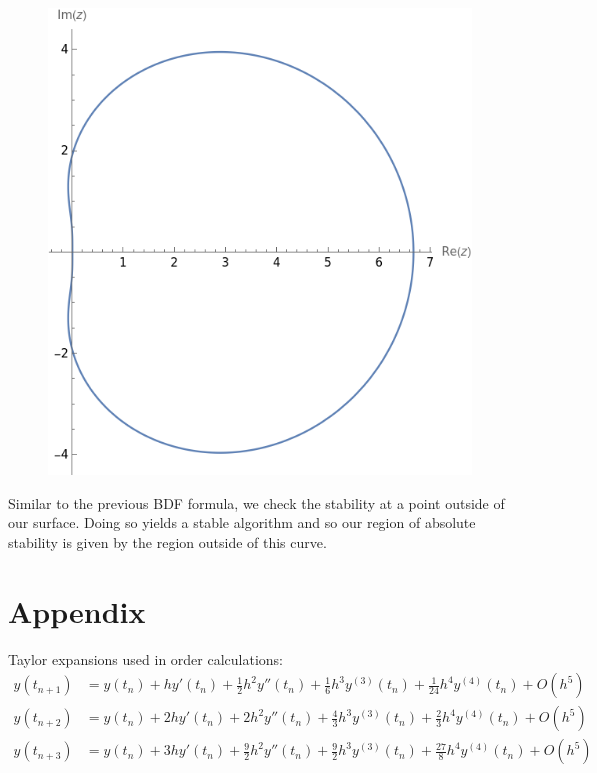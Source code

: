 \documentclass[a4paper,12pt]{article}
\begin{document}
\begin{enumerate}[label = (\arabic*)]
	\begin{figure}[h]
		\centering
		\includegraphics[width = 0.4 \textwidth]{Images/BDF3.png}
	\end{figure}

	Similar to the previous BDF formula, we check the stability at a point outside of our surface. Doing so yields a stable algorithm and so our region of absolute stability is given by the region outside of this curve.
\end{enumerate}

\newpage
\section{Appendix} \label{sec:app}
Taylor expansions used in order calculations:
\begin{align*}
	y(t_{n + 1}) &= y(t_n)+h y'(t_n)+\frac{1}{2} h^2 y''(t_n)+\frac{1}{6} h^3 y^{(3)}(t_n)+\frac{1}{24} h^4 y^{(4)}(t_n)+O\left(h^5\right) \\
	y(t_{n + 2}) & = y(t_n)+2 h y'(t_n)+2 h^2 y''(t_n)+\frac{4}{3} h^3 y^{(3)}(t_n)+\frac{2}{3} h^4 y^{(4)}(t_n)+O\left(h^5\right) \\
	y(t_{n + 3}) & = y(t_n)+3 h y'(t_n)+\frac{9}{2} h^2 y''(t_n)+\frac{9}{2} h^3 y^{(3)}(t_n)+\frac{27}{8} h^4 y^{(4)}(t_n)+O\left(h^5\right)
\end{align*}
\end{document}
